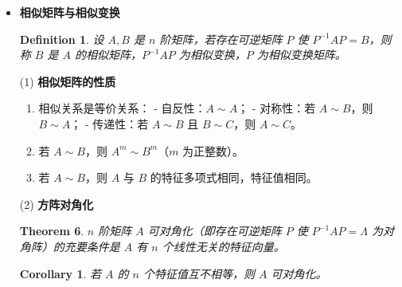 \documentclass[UTF8]{ctexart}
\newtheorem{theorem}{Theorem}
\newtheorem{definition}{Definition}
\newtheorem{corollary}{Corollary}
\begin{document}
\begin{itemize}
		(2) \textbf{特征值与特征向量的性质}  
		\begin{theorem}
			设 \(n\) 阶方阵 \(A = (a_{ij})\) 的特征值为 \(\lambda_1, \lambda_2, \cdots, \lambda_n\)，则：  
			\begin{enumerate}
				\item \(\lambda_1 + \lambda_2 + \cdots + \lambda_n = a_{11} + a_{22} + \cdots + a_{nn}\)；  
				\item \(\lambda_1\lambda_2\cdots\lambda_n = |A|\)。
			\end{enumerate}
		\end{theorem}
		\begin{theorem}
			属于不同特征值的特征向量线性无关。
		\end{theorem}
		\begin{theorem}
			矩阵 \(A\) 和 \(A'\) 有相同的特征值。
		\end{theorem}
		\begin{theorem}
			若 \(\lambda\) 是 \(A\) 的特征值，则 \(\lambda^k\) 是 \(A^k\) 的特征值。
		\end{theorem}
		\begin{theorem}
			若 \(\lambda\) 是可逆矩阵 \(A\) 的特征值，则 \(\lambda^{-1}\) 是 \(A^{-1}\) 的特征值。
		\end{theorem}
		
		\item \textbf{相似矩阵与相似变换}  
		\begin{definition}
			设 \(A, B\) 是 \(n\) 阶矩阵，若存在可逆矩阵 \(P\) 使 \(P^{-1}AP = B\)，则称 \(B\) 是 \(A\) 的相似矩阵，\(P^{-1}AP\) 为相似变换，\(P\) 为相似变换矩阵。
		\end{definition}
		
		(1) \textbf{相似矩阵的性质}  
		\begin{enumerate}
			\item 相似关系是等价关系：  
			- 自反性：\(A \sim A\)；  
			- 对称性：若 \(A \sim B\)，则 \(B \sim A\)；  
			- 传递性：若 \(A \sim B\) 且 \(B \sim C\)，则 \(A \sim C\)。  
			\item 若 \(A \sim B\)，则 \(A^m \sim B^m\)（\(m\) 为正整数）。  
			\item 若 \(A \sim B\)，则 \(A\) 与 \(B\) 的特征多项式相同，特征值相同。  
		\end{enumerate}
		
		(2) \textbf{方阵对角化}  
		\begin{theorem}
			\(n\) 阶矩阵 \(A\) 可对角化（即存在可逆矩阵 \(P\) 使 \(P^{-1}AP = \Lambda\) 为对角阵）的充要条件是 \(A\) 有 \(n\) 个线性无关的特征向量。
		\end{theorem}
		\begin{corollary}
			若 \(A\) 的 \(n\) 个特征值互不相等，则 \(A\) 可对角化。
		\end{corollary}
		

\end{itemize}
\end{document}
